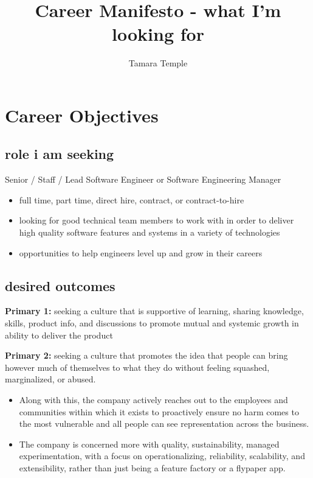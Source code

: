 \documentclass[
]{article}
\author{Tamara Temple}
\title{Career Manifesto - what I'm looking for}
\date{}
\providecommand{\tightlist}{%
  \setlength{\itemsep}{0pt}\setlength{\parskip}{0pt}}
\begin{document}
\maketitle

\section{Career Objectives}\label{career-objectives}

\subsection{role i am seeking}\label{role-i-am-seeking}

Senior / Staff / Lead Software Engineer or Software Engineering Manager

\begin{itemize}
\tightlist
\item full time, part time, direct hire, contract, or contract-to-hire
\item looking for good technical team members to work with in order to deliver high quality software features and systems in a variety of technologies
\item opportunities to help engineers level up and grow in their careers
\end{itemize}

\subsection{desired outcomes}\label{desired-outcomes}

\textbf{Primary 1:} seeking a culture that is supportive of learning, sharing knowledge, skills, product info, and discussions to promote mutual and systemic growth in ability to deliver the product

\textbf{Primary 2:} seeking a culture that promotes the idea that people can bring however much of themselves to what they do without feeling squashed, marginalized, or abused.

\begin{itemize}
\item Along with this, the company actively reaches out to the employees and communities within which it exists to proactively ensure no harm comes to the most vulnerable and all people can see representation across the business.
\item The company is concerned more with quality, sustainability, managed experimentation, with a focus on operationalizing, reliability, scalability, and extensibility, rather than just being a feature factory or a flypaper app.
\end{itemize}
\end{document}
